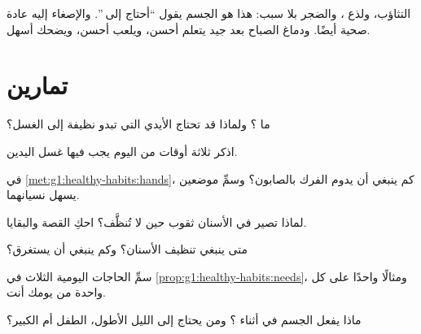 \begin{remark}\label{rem:g1:healthy-habits:tired}
التثاؤب، ولذع ، والضجر بلا سبب: هذا هو الجسم يقول ``أحتاج
إلى ''. والإصغاء إليه عادة صحية أيضًا. ودماغ الصباح بعد 
جيد يتعلم أحسن، ويلعب أحسن، ويضحك أسهل.
\end{remark}

\section{تمارين}

\begin{exercise}[$\star$]\label{exo:g1:healthy-habits:1}
ما ؟ ولماذا قد تحتاج الأيدي التي تبدو نظيفة إلى الغسل؟
\end{exercise}

\begin{exercise}[$\star$]\label{exo:g1:healthy-habits:2}
اذكر ثلاثة أوقات من اليوم يجب فيها غسل اليدين.
\end{exercise}

\begin{exercise}[$\star$]\label{exo:g1:healthy-habits:3}
في \cref{met:g1:healthy-habits:hands}، كم ينبغي أن يدوم الفرك
بالصابون؟ وسمِّ موضعين يسهل نسيانهما.
\end{exercise}

\begin{exercise}[$\star$]\label{exo:g1:healthy-habits:4}
لماذا تصير في الأسنان ثقوب حين لا تُنظَّف؟ احكِ القصة 
والبقايا.
\end{exercise}

\begin{exercise}[$\star$]\label{exo:g1:healthy-habits:5}
متى ينبغي تنظيف الأسنان؟ وكم ينبغي أن يستغرق؟
\end{exercise}

\begin{exercise}[$\star$]\label{exo:g1:healthy-habits:6}
سمِّ الحاجات اليومية الثلاث في \cref{prop:g1:healthy-habits:needs}،
ومثالًا واحدًا على كل واحدة من يومك أنت.
\end{exercise}

\begin{exercise}[$\star$]\label{exo:g1:healthy-habits:7}
ماذا يفعل الجسم في أثناء ؟ ومن يحتاج إلى الليل الأطول، الطفل
أم الكبير؟
\end{exercise}

